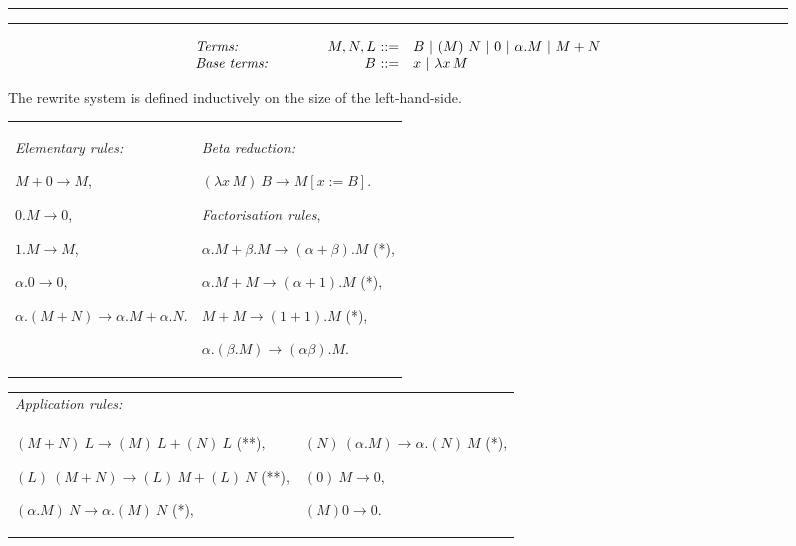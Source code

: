 \documentclass{LMCS}
\begin{document}
\begin{figure}
  {
    \hrule\vspace{1pt}\hrule
    $$\begin{array}[t]{l@{\hspace{1.5cm}}r@{\ ::=\quad}l}
      \textrm{\itshape Terms:} & M,N,L & B\ |\ (M)~N\ |\ 0\ |\ \alpha.M\ |\ M+N\\
      \textrm{\itshape Base terms:} & B & x\ |\ \lambda x\,M
    \end{array}$$

    The rewrite system is defined inductively on the size of the left-hand-side.\\[2ex]
    
    \begin{tabular}{p{5.6cm}p{5.6cm}} \noindent \emph{Elementary rules:}

      \noindent $M+0\to M$,

      \noindent $0.M\to0$,

      \noindent $1.M\to M$,

      \noindent $\alpha.0\to0$,

      \noindent $\alpha.(M+N)\to\alpha.M+\alpha.N$.
      &
      \noindent \emph{Beta reduction:}

      \noindent $(\lambda x\,M)~B\to M[x:=B]$.
      \medskip
      
      \noindent \emph{Factorisation rules},
      
      \noindent $\alpha.M+\beta.M\to(\alpha+\beta).M$  (*),
      
      \noindent $\alpha.M+M\to(\alpha+1).M$  (*),
      
      \noindent $M+M\to(1+1).M$  (*),
      
      \noindent $\alpha.(\beta.M)\to(\alpha\beta).M$.
    \end{tabular}
    \medskip

    \begin{tabular}{p{6cm}p{5.6cm}}
      \multicolumn{2}{l}{\emph{Application rules:}} \\
      \noindent $(M+N)~L\to (M)~L+(N)~L$ (**),

      \noindent $(L)~(M+N)\to (L)~M+(L)~N$ (**),

      \noindent $(\alpha.M)~N\to\alpha.(M)~N$ (*), &

      \noindent $(N)~(\alpha.M)\to\alpha.(N)~M$ (*),

      \noindent $(0)~M\to0$,

      \noindent $(M) 0\to0$.
    \end{tabular}
  }
  \bigskip


\end{figure}
\end{document}
